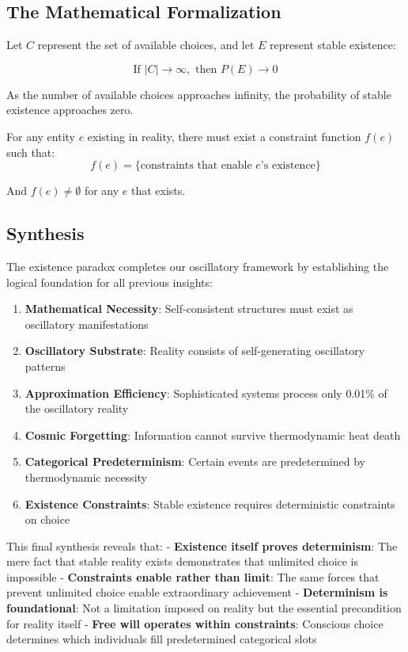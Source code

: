\documentclass[11pt]{article}
\theoremstyle{remark}
\begin{document}
\subsection{The Mathematical Formalization}

Let $C$ represent the set of available choices, and let $E$ represent stable existence:

$$\text{If } |C| \to \infty, \text{ then } P(E) \to 0$$

As the number of available choices approaches infinity, the probability of stable existence approaches zero.

For any entity $e$ existing in reality, there must exist a constraint function $f(e)$ such that:
$$f(e) = \{\text{constraints that enable } e\text{'s existence}\}$$

And $f(e) \neq \emptyset$ for any $e$ that exists.

\subsection{Synthesis}

The existence paradox completes our oscillatory framework by establishing the logical foundation for all previous insights:

\begin{enumerate}
\item \textbf{Mathematical Necessity}: Self-consistent structures must exist as oscillatory manifestations
\item \textbf{Oscillatory Substrate}: Reality consists of self-generating oscillatory patterns
\item \textbf{Approximation Efficiency}: Sophisticated systems process only 0.01\% of the oscillatory reality
\item \textbf{Cosmic Forgetting}: Information cannot survive thermodynamic heat death
\item \textbf{Categorical Predeterminism}: Certain events are predetermined by thermodynamic necessity
\item \textbf{Existence Constraints}: Stable existence requires deterministic constraints on choice
\end{enumerate}

This final synthesis reveals that:
- \textbf{Existence itself proves determinism}: The mere fact that stable reality exists demonstrates that unlimited choice is impossible
- \textbf{Constraints enable rather than limit}: The same forces that prevent unlimited choice enable extraordinary achievement
- \textbf{Determinism is foundational}: Not a limitation imposed on reality but the essential precondition for reality itself
- \textbf{Free will operates within constraints}: Conscious choice determines which individuals fill predetermined categorical slots
\end{document}
